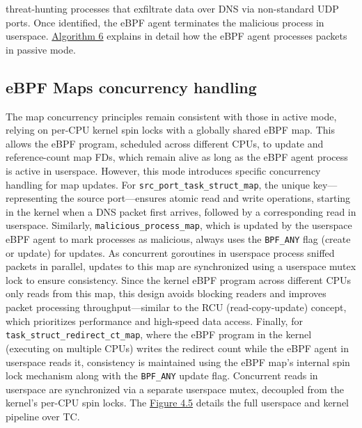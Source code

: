 \documentclass [11pt, proquest] {uwthesis}[2020/02/24]
\begin{document}
threat-hunting processes that exfiltrate data over DNS via non-standard UDP ports. Once identified, the eBPF agent terminates the malicious process in userspace. \hyperref[sec:alg6]{Algorithm 6} explains in detail how the eBPF agent processes packets in passive mode.

\subsection{\textbf{eBPF Maps concurrency handling}}
\label{passive:sec3}
The map concurrency principles remain consistent with those in active mode, relying on per-CPU kernel spin locks with a globally shared eBPF map. This allows the eBPF program, scheduled across different CPUs, to update and reference-count map FDs, which remain alive as long as the eBPF agent process is active in userspace. However, this mode introduces specific concurrency handling for map updates. For \texttt{src\_port\_task\_struct\_map}, the unique key—representing the source port—ensures atomic read and write operations, starting in the kernel when a DNS packet first arrives, followed by a corresponding read in userspace. Similarly, \texttt{malicious\_process\_map}, which is updated by the userspace eBPF agent to mark processes as malicious, always uses the \texttt{BPF\_ANY} flag (create or update) for updates. As concurrent goroutines in userspace process sniffed packets in parallel, updates to this map are synchronized using a userspace mutex lock to ensure consistency. Since the kernel eBPF program across different CPUs only reads from this map, this design avoids blocking readers and improves packet processing throughput—similar to the RCU (read-copy-update) concept, which prioritizes performance and high-speed data access. Finally, for \texttt{task\_struct\_redirect\_ct\_map}, where the eBPF program in the kernel (executing on multiple CPUs) writes the redirect count while the eBPF agent in userspace reads it, consistency is maintained using the eBPF map’s internal spin lock mechanism along with the \texttt{BPF\_ANY} update flag. Concurrent reads in userspace are synchronized via a separate userspace mutex, decoupled from the kernel’s per-CPU spin locks. The \hyperref[sec:dp-passive-phase]{Figure 4.5} details the full userspace and kernel pipeline over TC. 
\end{document}
